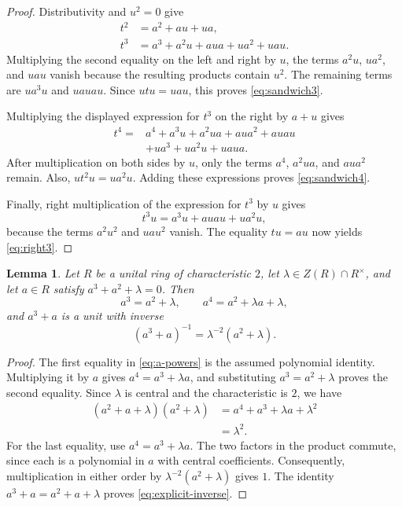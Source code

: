 \documentclass[12pt]{amsart}
\newtheorem{lemma}[theorem]{Lemma}
\theoremstyle{remark}
\numberwithin{equation}{section}
\theoremstyle{definition}
\begin{document}
\begin{proof}
Distributivity and $u^2=0$ give
\begin{align*}
 t^2&=a^2+au+ua,\\
 t^3&=a^3+a^2u+aua+ua^2+uau.
\end{align*}
Multiplying the second equality on the left and right by $u$, the terms $a^2u$, $ua^2$, and $uau$ vanish because the resulting products contain $u^2$. The remaining terms are $ua^3u$ and $uauau$. Since $utu=uau$, this proves \eqref{eq:sandwich3}.

Multiplying the displayed expression for $t^3$ on the right by $a+u$ gives
\[
\begin{split}
 t^4={}&a^4+a^3u+a^2ua+aua^2+auau\\
       &+ua^3+ua^2u+uaua.
\end{split}
\]
After multiplication on both sides by $u$, only the terms $a^4$, $a^2ua$, and $aua^2$ remain. Also, $ut^2u=ua^2u$. Adding these expressions proves \eqref{eq:sandwich4}.

Finally, right multiplication of the expression for $t^3$ by $u$ gives
\[
 t^3u=a^3u+auau+ua^2u,
\]
because the terms $a^2u^2$ and $uau^2$ vanish. The equality $tu=au$ now yields \eqref{eq:right3}.
\end{proof}

\begin{lemma}\label{lem:inverse}
Let $R$ be a unital ring of characteristic $2$, let $\lambda\in Z(R)\cap R^\times$, and let $a\in R$ satisfy $a^3+a^2+\lambda=0$. Then
\begin{equation}\label{eq:a-powers}
 a^3=a^2+\lambda,\qquad a^4=a^2+\lambda a+\lambda,
\end{equation}
and $a^3+a$ is a unit with inverse
\begin{equation}\label{eq:explicit-inverse}
 (a^3+a)^{-1}=\lambda^{-2}(a^2+\lambda).
\end{equation}
\end{lemma}

\begin{proof}
The first equality in \eqref{eq:a-powers} is the assumed polynomial identity. Multiplying it by $a$ gives $a^4=a^3+\lambda a$, and substituting $a^3=a^2+\lambda$ proves the second equality. Since $\lambda$ is central and the characteristic is $2$, we have
\begin{align*}
 (a^2+a+\lambda)(a^2+\lambda)
 &=a^4+a^3+\lambda a+\lambda^2\\
 &=\lambda^2.
\end{align*}
For the last equality, use $a^4=a^3+\lambda a$. The two factors in the product commute, since each is a polynomial in $a$ with central coefficients. Consequently, multiplication in either order by $\lambda^{-2}(a^2+\lambda)$ gives $1$. The identity $a^3+a=a^2+a+\lambda$ proves \eqref{eq:explicit-inverse}.
\end{proof}
\end{document}
